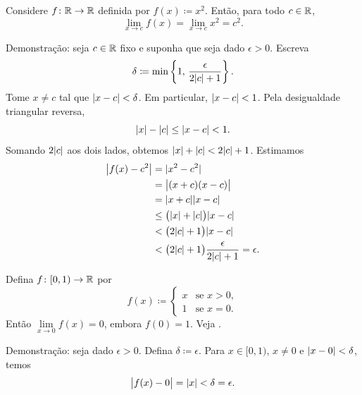 \begin{example}
Considere $f \colon {\mathbb{R}} \to {\mathbb{R}}$ definida por $f(x) \coloneqq x^2$. Então,
para todo $c \in {\mathbb{R}}$,
\begin{equation*}
\lim_{x\to c} f(x) = \lim_{x\to c} x^2 = c^2 .
\end{equation*}

Demonstração: seja $c \in {\mathbb{R}}$ fixo e suponha que seja dado $\epsilon > 0$. Escreva
\begin{equation*}
\delta \coloneqq \min \left\{ 1 , \, \frac{\epsilon}{2\lvert {c} \rvert+1} \right\} .
\end{equation*}
Tome $x \neq c$ tal que $\lvert {x-c} \rvert < \delta$. Em particular,
$\lvert {x-c} \rvert < 1$. Pela desigualdade triangular reversa,
\begin{equation*}
\lvert {x} \rvert-\lvert {c} \rvert \leq \lvert {x-c} \rvert < 1 .
\end{equation*}
Somando $2\lvert {c} \rvert$ aos dois lados, obtemos
$\lvert {x} \rvert + \lvert {c} \rvert < 2\lvert {c} \rvert + 1$. Estimamos
\begin{equation*}
\begin{split}
\bigl\lvert {f(x) - c^2} \bigr\rvert &= \lvert {x^2-c^2} \rvert \\
&= \bigl\lvert {(x+c)(x-c)} \bigr\rvert \\
&= \lvert {x+c} \rvert\lvert {x-c} \rvert \\
&\leq \bigl(\lvert {x} \rvert+\lvert {c} \rvert\bigr)\lvert {x-c} \rvert \\
&< \bigl(2\lvert {c} \rvert+1\bigr)\lvert {x-c} \rvert \\
&< \bigl(2\lvert {c} \rvert+1\bigr)\frac{\epsilon}{2\lvert {c} \rvert+1} = \epsilon .
\end{split}
\end{equation*}
\end{example}

\begin{example}
Defina $f \colon [0,1) \to {\mathbb{R}}$ por
\begin{equation*}
f(x) \coloneqq
\begin{cases}
x & \text{se } x > 0 , \\
1 & \text{se } x = 0 .
\end{cases}
\end{equation*}
Então
$\lim\limits_{x\to 0} f(x) = 0$,
embora $f(0) = 1$. Veja .
\begin{myfigureht}
\caption{Função cujo limite em $0$ difere de seu valor.\label{fig:limvaldiff}}
\end{myfigureht}

Demonstração: seja dado $\epsilon > 0$. Defina $\delta \coloneqq \epsilon$.
Para $x \in [0,1)$, $x \neq 0$ e $\lvert {x-0} \rvert < \delta$, temos
\begin{equation*}
\bigl\lvert {f(x) - 0} \bigr\rvert = \lvert {x} \rvert < \delta = \epsilon .
\end{equation*}
\end{example}

